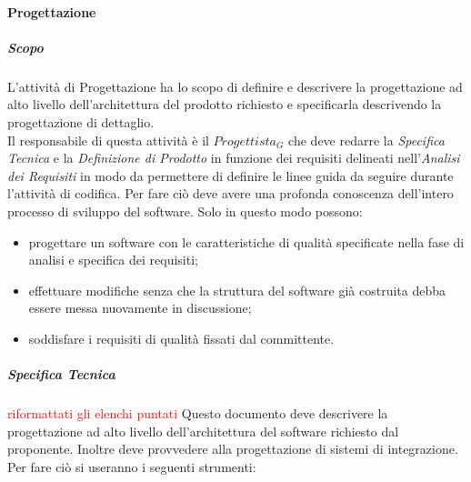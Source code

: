		\paragraph{Progettazione}
			\subparagraph{Scopo}
			\Spazio
			L'attività di Progettazione  ha lo scopo di definire e descrivere la progettazione ad alto livello dell'architettura del prodotto richiesto e specificarla descrivendo la progettazione di dettaglio. \\
			Il responsabile di questa attività è il \emph{$Progettista_G$} che deve redarre la \textit{Specifica Tecnica} e la \textit{Definizione di Prodotto} in funzione dei requisiti delineati nell'\textit{Analisi dei Requisiti} in modo da permettere di definire le linee guida da seguire durante l'attività di codifica.
			Per fare ciò deve avere una profonda conoscenza dell'intero processo di sviluppo del software.
			Solo in questo modo possono:
			\begin{itemize}
				\item progettare un software con le caratteristiche di qualità specificate nella fase di analisi e specifica dei requisiti;
				\item effettuare modifiche senza che la struttura del software già costruita debba essere messa nuovamente in discussione;
				\item soddisfare i requisiti di qualità fissati dal committente.
			\end{itemize}
			\subparagraph{Specifica Tecnica}
			\textcolor{red}{riformattati gli elenchi puntati}
			\Spazio
			Questo documento deve descrivere la progettazione ad alto livello dell'architettura del software richiesto dal proponente. Inoltre deve provvedere alla progettazione di sistemi di integrazione. 
			Per fare ciò si useranno i seguenti strumenti:
